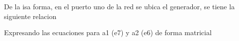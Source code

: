 \documentclass{article}
\begin{document}
\begin{maplegroup}
\mapleresult
\begin{maplelatex}
\end{maplelatex}
\end{maplegroup}
\begin{Maple Normal}{
\begin{Maple Normal}{
De la isa forma, en el puerto uno de la red se ubica el generador, se tiene la siguiente relacion}\end{Maple Normal}

}\end{Maple Normal}

\begin{maplegroup}
\mapleresult
\begin{maplelatex}
\end{maplelatex}
\end{maplegroup}
\begin{Maple Normal}{
\begin{Maple Normal}{
Expresando las ecuaciones para a1 (e7) y a2 (e6) de forma matricial}\end{Maple Normal}

}\end{Maple Normal}
\end{document}
